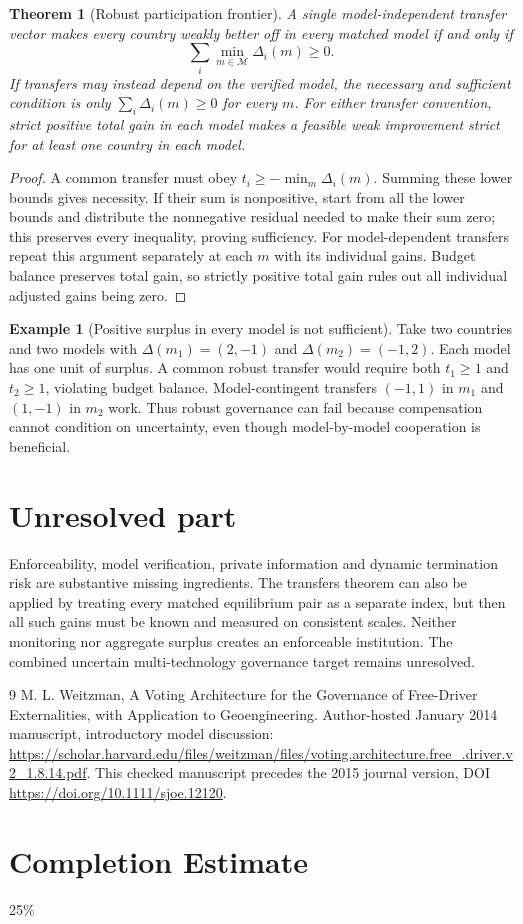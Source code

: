 \documentclass[11pt]{article}
\newtheorem{theorem}{Theorem}
\theoremstyle{definition}
\newtheorem{example}{Example}
\begin{document}
\begin{theorem}[Robust participation frontier]
A single model-independent transfer vector makes every country weakly better off in every matched model if and only if
\[
 \sum_i\min_{m\in\mathcal M}\Delta_i(m)\geq0.
\]
If transfers may instead depend on the verified model, the necessary and sufficient condition is only $\sum_i\Delta_i(m)\geq0$ for every $m$. For either transfer convention, strict positive total gain in each model makes a feasible weak improvement strict for at least one country in each model.
\end{theorem}
\begin{proof}
A common transfer must obey $t_i\geq-\min_m\Delta_i(m)$. Summing these lower bounds gives necessity. If their sum is nonpositive, start from all the lower bounds and distribute the nonnegative residual needed to make their sum zero; this preserves every inequality, proving sufficiency. For model-dependent transfers repeat this argument separately at each $m$ with its individual gains. Budget balance preserves total gain, so strictly positive total gain rules out all individual adjusted gains being zero.
\end{proof}

\begin{example}[Positive surplus in every model is not sufficient]
Take two countries and two models with $\Delta(m_1)=(2,-1)$ and $\Delta(m_2)=(-1,2)$. Each model has one unit of surplus. A common robust transfer would require both $t_1\geq1$ and $t_2\geq1$, violating budget balance. Model-contingent transfers $(-1,1)$ in $m_1$ and $(1,-1)$ in $m_2$ work. Thus robust governance can fail because compensation cannot condition on uncertainty, even though model-by-model cooperation is beneficial.
\end{example}

\section*{Unresolved part}
Enforceability, model verification, private information and dynamic termination risk are substantive missing ingredients. The transfers theorem can also be applied by treating every matched equilibrium pair as a separate index, but then all such gains must be known and measured on consistent scales. Neither monitoring nor aggregate surplus creates an enforceable institution. The combined uncertain multi-technology governance target remains unresolved.
\begin{thebibliography}{9}
 M. L. Weitzman, A Voting Architecture for the Governance of Free-Driver Externalities, with Application to Geoengineering. Author-hosted January 2014 manuscript, introductory model discussion: \url{https://scholar.harvard.edu/files/weitzman/files/voting.architecture.free_.driver.v2_1.8.14.pdf}. This checked manuscript precedes the 2015 journal version, DOI \url{https://doi.org/10.1111/sjoe.12120}.
\end{thebibliography}

\section{Completion Estimate}
25\%
\end{document}
